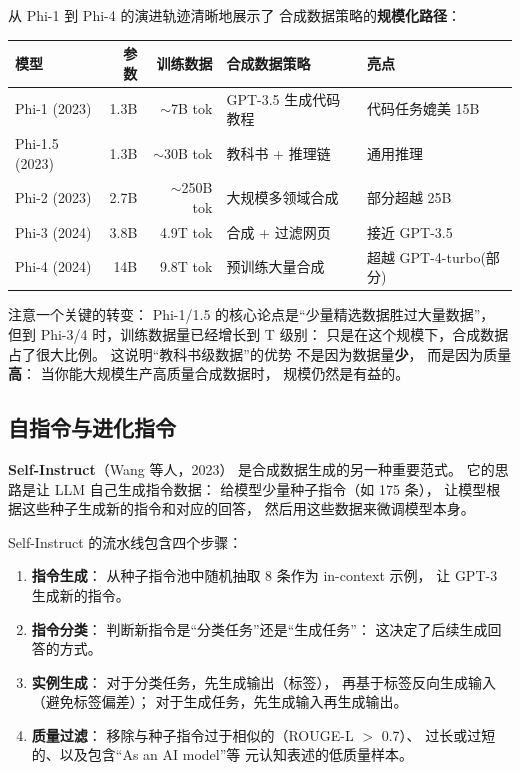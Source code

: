 从 Phi-1 到 Phi-4 的演进轨迹清晰地展示了
合成数据策略的\textbf{规模化路径}：

\begin{center}\small
\renewcommand{\arraystretch}{1.3}
\begin{tabular}{lrrll}
\toprule
\rowcolor{figLightGray}
\textbf{模型} & \textbf{参数} & \textbf{训练数据} & \textbf{合成数据策略} & \textbf{亮点} \\
\midrule
Phi-1 (2023) & 1.3B & $\sim$7B tok & GPT-3.5 生成代码教程 & 代码任务媲美 15B \\
Phi-1.5 (2023) & 1.3B & $\sim$30B tok & 教科书 + 推理链 & 通用推理 \\
Phi-2 (2023) & 2.7B & $\sim$250B tok & 大规模多领域合成 & 部分超越 25B \\
Phi-3 (2024) & 3.8B & 4.9T tok & 合成 + 过滤网页 & 接近 GPT-3.5 \\
Phi-4 (2024) & 14B & 9.8T tok & 预训练大量合成 & 超越 GPT-4-turbo(部分) \\
\bottomrule
\end{tabular}
\end{center}

注意一个关键的转变：
Phi-1/1.5 的核心论点是“少量精选数据胜过大量数据”，
但到 Phi-3/4 时，训练数据量已经增长到 T 级别：
只是在这个规模下，合成数据占了很大比例。
这说明“教科书级数据”的优势
不是因为数据量\textbf{少}，
而是因为质量\textbf{高}：
当你能大规模生产高质量合成数据时，
规模仍然是有益的。

\subsection{自指令与进化指令}

\textbf{Self-Instruct}（Wang 等人，2023）
是合成数据生成的另一种重要范式。
它的思路是让 LLM 自己生成指令数据：
给模型少量种子指令（如 175 条），
让模型根据这些种子生成新的指令和对应的回答，
然后用这些数据来微调模型本身。

Self-Instruct 的流水线包含四个步骤：
\begin{enumerate}[noitemsep]
  \item \textbf{指令生成}：
        从种子指令池中随机抽取 8 条作为 in-context 示例，
        让 GPT-3 生成新的指令。
  \item \textbf{指令分类}：
        判断新指令是“分类任务”还是“生成任务”：
        这决定了后续生成回答的方式。
  \item \textbf{实例生成}：
        对于分类任务，先生成输出（标签），
        再基于标签反向生成输入（避免标签偏差）；
        对于生成任务，先生成输入再生成输出。
  \item \textbf{质量过滤}：
        移除与种子指令过于相似的（ROUGE-L $>$ 0.7）、
        过长或过短的、以及包含“As an AI model”等
        元认知表述的低质量样本。
\end{enumerate}

